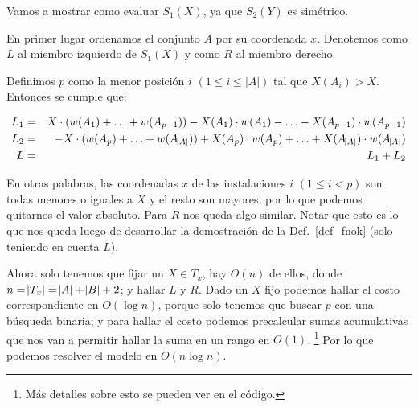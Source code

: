 Vamos a mostrar como evaluar $S_1(X)$, ya que $S_2(Y)$ es simétrico.

En primer lugar ordenamos el conjunto $A$ por su coordenada $x$. Denotemos como $L$ al miembro izquierdo de $S_1(X)$ y como $R$ al miembro derecho.

Definimos $p$ como la menor posición $i$ $(1 \le i \le |A|)$ tal que $X(A_i) > X$. Entonces se cumple que:

\begin{eqnarray*}
    L_1 &=& X \cdot (w(A_1) + \ldots + w(A_{p-1})) - X(A_1) \cdot w(A_1) - \ldots - X(A_{p-1}) \cdot w(A_{p-1}) \\
    L_2 &=& -X \cdot (w(A_p) + \ldots + w(A_{\abs{A}})) + X(A_p) \cdot w(A_p) + \ldots + X(A_{\abs{A}}) \cdot w(A_{\abs{A}}) \\
    L &=& L_1 + L_2
\end{eqnarray*}

En otras palabras, las coordenadas $x$ de las instalaciones $i$ $(1 \le i < p)$ son todas menores o iguales a $X$ y el resto son mayores, por lo que podemos quitarnos el valor absoluto. Para $R$ nos queda algo similar. Notar que esto es lo que nos queda luego de desarrollar la demostración de la Def.~\ref{def_fnok} (solo teniendo en cuenta $L$).

Ahora solo tenemos que fijar un $X \in T_x$, hay $O(n)$ de ellos, donde $n = \abs{T_x} = \abs{A} + \abs{B} + 2$; y hallar $L$ y $R$. Dado un $X$ fijo podemos hallar el costo correspondiente en $O(\log n )$, porque solo tenemos que buscar $p$ con una búsqueda binaria; y para hallar el costo podemos precalcular sumas acumulativas que nos van a permitir hallar la suma en un rango en $O(1)$. \footnote{Más detalles sobre esto se pueden ver en el código.} Por lo que podemos resolver el modelo en $O(n \log n)$.